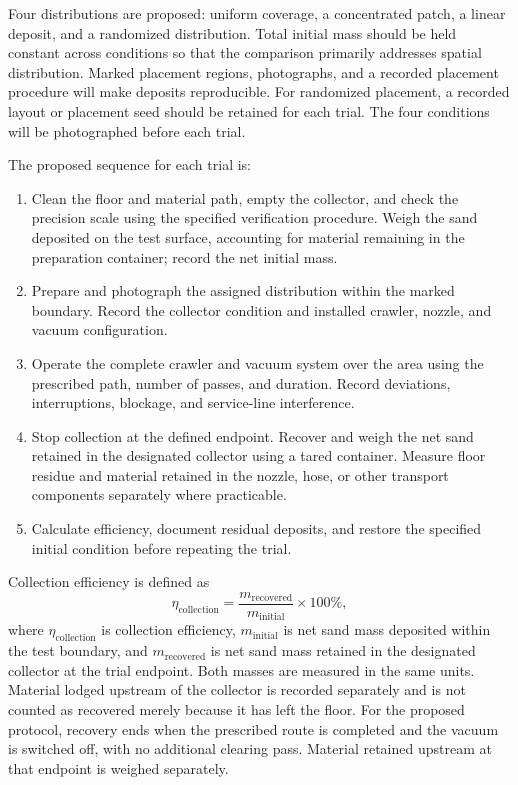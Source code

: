 Four distributions are proposed: uniform coverage, a concentrated patch, a linear deposit, and a randomized distribution. Total initial mass should be held constant across conditions so that the comparison primarily addresses spatial distribution. Marked placement regions, photographs, and a recorded placement procedure will make deposits reproducible. For randomized placement, a recorded layout or placement seed should be retained for each trial. The four conditions will be photographed before each trial.



The proposed sequence for each trial is:
\begin{enumerate}
\item Clean the floor and material path, empty the collector, and check the precision scale using the specified verification procedure. Weigh the sand deposited on the test surface, accounting for material remaining in the preparation container; record the net initial mass.
\item Prepare and photograph the assigned distribution within the marked boundary. Record the collector condition and installed crawler, nozzle, and vacuum configuration.
\item Operate the complete crawler and vacuum system over the area using the prescribed path, number of passes, and duration. Record deviations, interruptions, blockage, and service-line interference.
\item Stop collection at the defined endpoint. Recover and weigh the net sand retained in the designated collector using a tared container. Measure floor residue and material retained in the nozzle, hose, or other transport components separately where practicable.
\item Calculate efficiency, document residual deposits, and restore the specified initial condition before repeating the trial.
\end{enumerate}

Collection efficiency is defined as
\begin{equation}
\eta_{\mathrm{collection}}=\frac{m_{\mathrm{recovered}}}{m_{\mathrm{initial}}}\times100\% ,
\label{eq:recovery}
\end{equation}
where $\eta_{\mathrm{collection}}$ is collection efficiency, $m_{\mathrm{initial}}$ is net sand mass deposited within the test boundary, and $m_{\mathrm{recovered}}$ is net sand mass retained in the designated collector at the trial endpoint. Both masses are measured in the same units. Material lodged upstream of the collector is recorded separately and is not counted as recovered merely because it has left the floor. For the proposed protocol, recovery ends when the prescribed route is completed and the vacuum is switched off, with no additional clearing pass. Material retained upstream at that endpoint is weighed separately.

